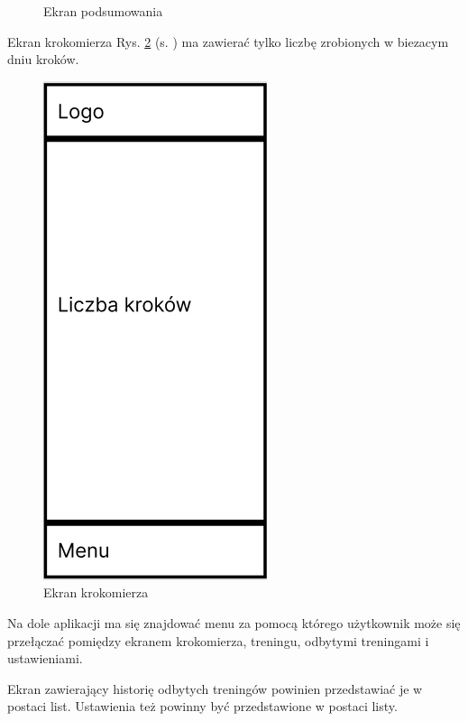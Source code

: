 \begin{figure}[!htb]
\begin{minipage}{.5\textwidth}
		\caption{Ekran podsumowania}
		\label{rys:rysunek002}
	\end{minipage}
\end{figure}

\hspace{0.60cm}Ekran krokomierza Rys. \ref{rys:rysunek003} (s. \pageref{rys:rysunek003}) ma zawierać tylko liczbę zrobionych w biezacym dniu kroków.

\begin{figure}[!htb]
	\centering
	\includegraphics[width=.2\linewidth]{rys/ekran_krokomierza.png}
	\caption{Ekran krokomierza}
	\label{rys:rysunek003}
\end{figure}


\hspace{0.60cm}Na dole aplikacji ma się znajdować menu za pomocą którego użytkownik może się przełączać pomiędzy ekranem krokomierza, treningu, odbytymi treningami i ustawieniami.

\hspace{0.60cm}Ekran zawierający historię odbytych treningów powinien przedstawiać je w postaci list. Ustawienia też powinny być przedstawione w postaci listy. 
 